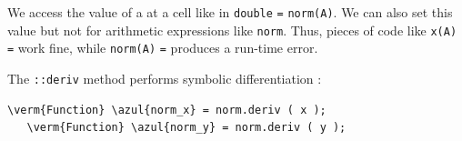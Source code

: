 We access the value of a {\small\tt {}} at a cell like in {\small\tt double}
{\small\tt {}} {\small\tt =} {\small\tt norm(A)}.
We can also set this value but not for arithmetic expressions like {\small\tt norm}.
Thus, pieces of code like {\small\tt x(A)} {\small\tt =} {\small\tt {}} work fine,
while {\small\tt norm(A)} {\small\tt =} {\small\tt {}} produces a run-time error.

The {\small\tt {}::deriv} method performs symbolic differentiation :

\begin{Verbatim}[commandchars=\\\{\},formatcom=\small\tt,baselinestretch=0.94]
   \verm{Function} \azul{norm_x} = norm.deriv ( x );
   \verm{Function} \azul{norm_y} = norm.deriv ( y );
\end{Verbatim}


